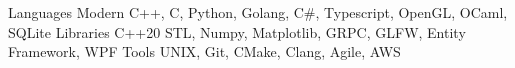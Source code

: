 


\begin{cvskills}


\cvskill
{Languages} %
{Modern C++, C, Python, Golang, C\#, Typescript, OpenGL, OCaml, SQLite}
\cvskill
{Libraries}
{C++20 STL, Numpy, Matplotlib, GRPC, GLFW, Entity Framework, WPF}
\cvskill
{Tools}
{UNIX, Git, CMake, Clang, Agile, AWS}



\end{cvskills}